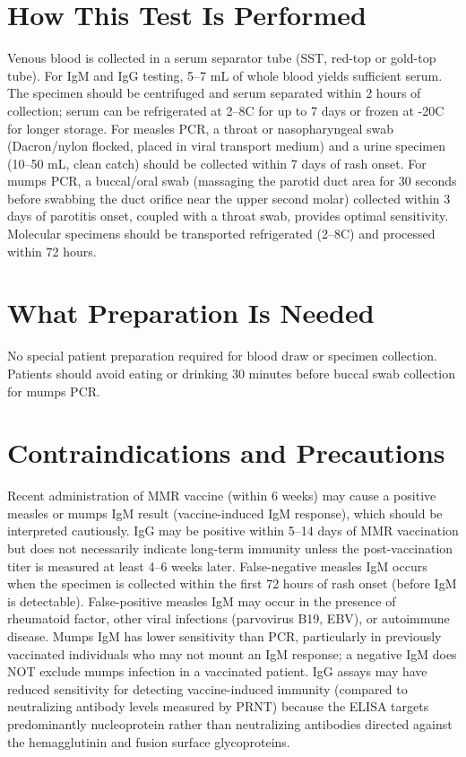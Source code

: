 \section*{How This Test Is Performed}
Venous blood is collected in a serum separator tube (SST, red-top or gold-top tube). For IgM and IgG testing, 5--7 mL of whole blood yields sufficient serum. The specimen should be centrifuged and serum separated within 2 hours of collection; serum can be refrigerated at 2--8\textdegree{}C for up to 7 days or frozen at -20\textdegree{}C for longer storage. For measles PCR, a throat or nasopharyngeal swab (Dacron/nylon flocked, placed in viral transport medium) and a urine specimen (10--50 mL, clean catch) should be collected within 7 days of rash onset. For mumps PCR, a buccal/oral swab (massaging the parotid duct area for 30 seconds before swabbing the duct orifice near the upper second molar) collected within 3 days of parotitis onset, coupled with a throat swab, provides optimal sensitivity. Molecular specimens should be transported refrigerated (2--8\textdegree{}C) and processed within 72 hours.

\section*{What Preparation Is Needed}
No special patient preparation required for blood draw or specimen collection. Patients should avoid eating or drinking 30 minutes before buccal swab collection for mumps PCR.

\section*{Contraindications and Precautions}
Recent administration of MMR vaccine (within 6 weeks) may cause a positive measles or mumps IgM result (vaccine-induced IgM response), which should be interpreted cautiously. IgG may be positive within 5--14 days of MMR vaccination but does not necessarily indicate long-term immunity unless the post-vaccination titer is measured at least 4--6 weeks later. False-negative measles IgM occurs when the specimen is collected within the first 72 hours of rash onset (before IgM is detectable). False-positive measles IgM may occur in the presence of rheumatoid factor, other viral infections (parvovirus B19, EBV), or autoimmune disease. Mumps IgM has lower sensitivity than PCR, particularly in previously vaccinated individuals who may not mount an IgM response; a negative IgM does NOT exclude mumps infection in a vaccinated patient. IgG assays may have reduced sensitivity for detecting vaccine-induced immunity (compared to neutralizing antibody levels measured by PRNT) because the ELISA targets predominantly nucleoprotein rather than neutralizing antibodies directed against the hemagglutinin and fusion surface glycoproteins.

